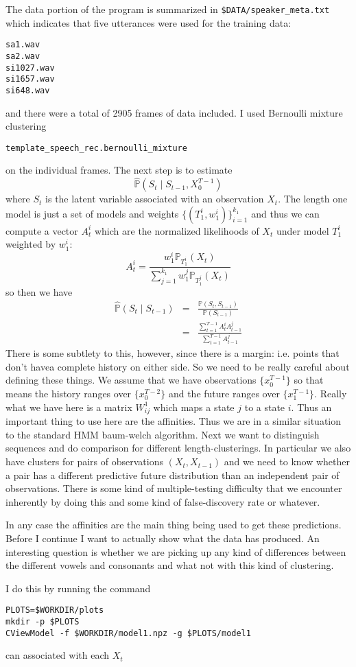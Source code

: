\documentclass{article}
\begin{document}
The data portion of the program is summarized in \texttt{\$DATA/speaker\_meta.txt}
which indicates that five utterances were used for the training
data:
\begin{verbatim}
sa1.wav
sa2.wav
si1027.wav
si1657.wav
si648.wav
\end{verbatim}
and there were a total of 2905 frames of data included.  I used
Bernoulli mixture clustering 
\begin{verbatim}
template_speech_rec.bernoulli_mixture
\end{verbatim}
on the individual frames.  The next step is to estimate
\begin{equation}
  \hat{\mathbb{P}}(S_t\mid S_{t-1}, X_0^{T-1})
\end{equation}
where $S_t$ is the latent variable associated with an observation $X_t$.
The length one model is just a set of models and weights $\{(T_1^i,w_1^i)\}_{i=1}^{k_1}$
and thus we can compute a vector $A_t^i$ which are the normalized likelihoods of
$X_t$ under model $T_1^i$ weighted by $w_1^i$:
\begin{equation}
  A_t^i = \frac{w_1^i\mathbb{P}_{T_1^i}(X_t)}{\sum_{j=1}^{k_1}w_1^j\mathbb{P}_{T_1^j}(X_t)}
\end{equation}
so then we have
\begin{equation}
  \begin{array}{rcl}
  \hat{\mathbb{P}}(S_t\mid S_{t-1}) &=& \frac{\mathbb{P}(S_t, S_{t-1})}{\mathbb{P}(S_{t-1})}\\
  &=& \frac{\sum_{t=1}^{T-1} A_t^i A_{t-1}^j}{\sum_{t=1}^{T-1}A_{t-1}^j}
  \end{array}
\end{equation}
There is some subtlety to this, however, since there is a margin: i.e. points that don't havea complete history on either side. So we need to be really careful about defining these things.  We assume that
we have observations $\{x_0^{T-1}\}$ so that means the history ranges
over $\{x_0^{T-2}\}$ and the future ranges over $\{x_1^{T-1}\}$. Really
what we have here is a matrix $W_{ij}^1$ which maps a state $j$
to a state $i$.  Thus an important thing to use here are the
affinities.  Thus we are in a similar situation to the standard
HMM baum-welch algorithm. Next we want to distinguish
sequences and do comparison for different length-clusterings.
In particular we also have clusters for pairs of observations
$(X_t,X_{t-1})$ and we need to know whether a pair has a different 
predictive future distribution than an independent pair of
observations.  There is some kind of multiple-testing difficulty
that we encounter inherently by doing this and some kind of
false-discovery rate or whatever.

In any case the affinities are the main thing being used to get
these predictions.  Before I continue I want to actually show
what the data has produced. An interesting question is whether
we are picking up any kind of differences between the different
vowels and consonants and what not with this kind of clustering.

 I do this by running the command
\begin{verbatim}
PLOTS=$WORKDIR/plots
mkdir -p $PLOTS
CViewModel -f $WORKDIR/model1.npz -g $PLOTS/model1
\end{verbatim}
 can associated with each $X_t$ 
\end{document}
